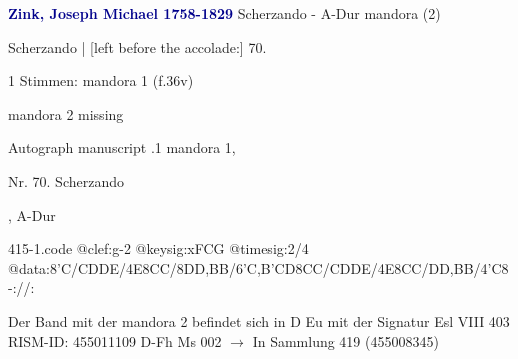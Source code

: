 \documentclass[twocolumn]{book}
\begin{document}
\newline \par \vspace{7pt} \textcolor{darkblue}{\textbf{Zink, Joseph Michael  1758-1829}}
\newline Scherzando - A-Dur
\newline mandora (2)
\newline \begin{itshape}[f.36v, at left:] Scherzando | [left before the accolade:] 70.\end{itshape} 
\newline \textcolor{darkblue}{}  1 Stimmen: mandora 1  (f.36v)
\newline \begin{small} mandora 2 missing\end{small} 
\newline Autograph manuscript
.1  mandora 1, \begin{itshape}Nr. 70. Scherzando\end{itshape}, A-Dur  
\begin{filecontents*}{415-1.code}
@clef:g-2
@keysig:xFCG
@timesig:2/4
@data:8'C/CDDE/4E{8CC}/8DD,BB/{6'C,B'CD}{8CC}/CDDE/4E{8CC}/DD,BB/4'C8-://:
\end{filecontents*}
\newline
%
\newline Der Band mit der mandora 2 befindet sich in D Eu mit der Signatur Esl VIII 403
\newline RISM-ID: 455011109
\newline D-Fh  Ms 002
\newline $\rightarrow$ In Sammlung 419 (455008345)
      
\end{document}
